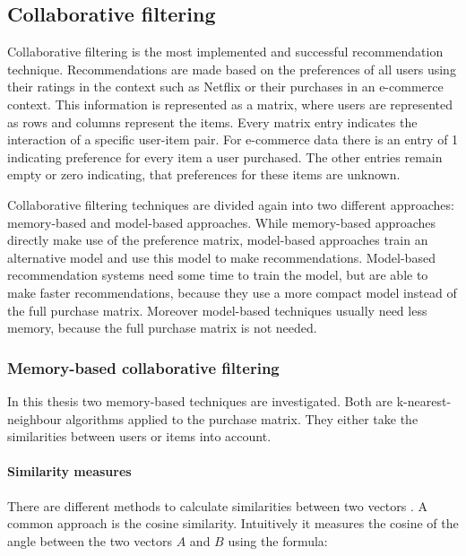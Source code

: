 \documentclass[10pt]{reportMaster}
\begin{document}
\subsection{Collaborative filtering}
\label{sec:collaborativeFiltering}
\label{rs_cf}

Collaborative filtering is the most implemented and successful recommendation technique.
Recommendations are made based on the preferences of all users using their ratings in the context such as Netflix or their purchases in an e-commerce context.
This information is represented as a matrix, where users are represented as rows and columns represent the items.
Every matrix entry indicates the interaction of a specific user-item pair.
For e-commerce data there is an entry of 1 indicating preference for every item a user purchased.
The other entries remain empty or zero indicating, that preferences for these items are unknown.

Collaborative filtering techniques are divided again into two different approaches: memory-based and model-based approaches.
While memory-based approaches directly make use of the preference matrix, model-based approaches train an alternative model and use this model to make recommendations.
Model-based recommendation systems need some time to train the model, but are able to make faster recommendations, because they use a more compact model instead of the full purchase matrix.
Moreover model-based techniques usually need less memory, because the full purchase matrix is not needed.

\subsubsection{Memory-based collaborative filtering}
\label{sec:memBasedCF}

In this thesis two memory-based techniques are investigated.
Both are k-nearest-neighbour algorithms applied to the purchase matrix.
They either take the similarities between users or items into account.

\paragraph{Similarity measures}
\label{par:simMeasures}
There are different methods to calculate similarities between two vectors \cite{dataMining}.
A common approach is the cosine similarity.
Intuitively it measures the cosine of the angle between the two vectors $A$ and $B$ using the formula:
\end{document}
